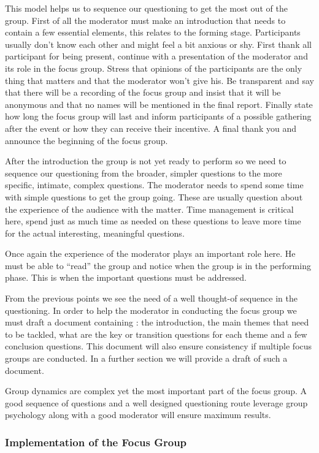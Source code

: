 \documentclass[10pt]{report}
\begin{document}
This model helps us to sequence our questioning to get the most out of the group. First of all the moderator must make an introduction that needs to contain a few essential elements, this relates to the forming stage. Participants usually don't know each other and might feel a bit anxious or shy. First thank all participant for being present, continue with a presentation of the moderator and its role in the focus group. Stress that opinions of the participants are the only thing that matters and that the moderator won't give his. Be transparent and say that there will be a recording of the focus group and insist that it will be anonymous and that no names will be mentioned in the final report. Finally state how long the focus group will last and inform participants of a possible gathering after the event or how they can receive their incentive. A final thank you and announce the beginning of the focus group.

After the introduction the group is not yet ready to perform so we need to sequence our questioning from the broader, simpler questions to the more specific, intimate, complex questions. The moderator needs to spend some time with simple questions to get the group going. These are usually question about the experience of the audience with the matter. Time management is critical here, spend just as much time as needed on these questions to leave more time for the actual interesting, meaningful questions.

Once again the experience of the moderator plays an important role here. He must be able to \enquote{read} the group and notice when the group is in the performing phase. This is when the important questions must be addressed.

From the previous points we see the need of a well thought-of sequence in the questioning. In order to help the moderator in conducting the focus group we must draft a document containing : the introduction, the main themes that need to be tackled, what are the key or transition questions for each theme and a few conclusion questions. This document will also ensure consistency if multiple focus groups are conducted. In a further section we will provide a draft of such a document.

Group dynamics are complex yet the most important part of the focus group. A good sequence of questions and a well designed questioning route leverage group psychology along with a good moderator will ensure maximum results.

\subsubsection{Implementation of the Focus Group}
\end{document}
